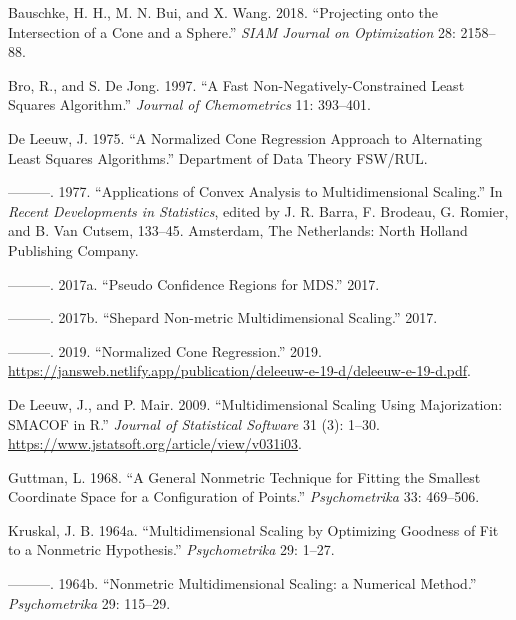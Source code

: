 \documentclass[
  12pt,
]{article}
\newlength{\cslhangindent}
\newenvironment{CSLReferences}[2] %
 {\begin{list}{}{%
  \setlength{\itemindent}{0pt}
  \setlength{\leftmargin}{0pt}
  \setlength{\parsep}{0pt}
  \ifodd #1
   \setlength{\leftmargin}{\cslhangindent}
   \setlength{\itemindent}{-1\cslhangindent}
  \fi
  \setlength{\itemsep}{#2\baselineskip}}}
 {\end{list}}
\begin{document}
\label{refs}
\begin{CSLReferences}{1}{0}
Bauschke, H. H., M. N. Bui, and X. Wang. 2018. {``{Projecting onto the Intersection of a Cone and a Sphere}.''} \emph{SIAM Journal on Optimization} 28: 2158--88.

Bro, R., and S. De Jong. 1997. {``A Fast Non-Negatively-Constrained Least Squares Algorithm.''} \emph{Journal of Chemometrics} 11: 393--401.

De Leeuw, J. 1975. {``{A Normalized Cone Regression Approach to Alternating Least Squares Algorithms}.''} Department of Data Theory FSW/RUL.

---------. 1977. {``Applications of Convex Analysis to Multidimensional Scaling.''} In \emph{Recent Developments in Statistics}, edited by J. R. Barra, F. Brodeau, G. Romier, and B. Van Cutsem, 133--45. Amsterdam, The Netherlands: North Holland Publishing Company.

---------. 2017a. {``{Pseudo Confidence Regions for MDS}.''} 2017.

---------. 2017b. {``{Shepard Non-metric Multidimensional Scaling}.''} 2017.

---------. 2019. {``Normalized Cone Regression.''} 2019. \url{https://jansweb.netlify.app/publication/deleeuw-e-19-d/deleeuw-e-19-d.pdf}.

De Leeuw, J., and P. Mair. 2009. {``{Multidimensional Scaling Using Majorization: SMACOF in R}.''} \emph{Journal of Statistical Software} 31 (3): 1--30. \url{https://www.jstatsoft.org/article/view/v031i03}.

Guttman, L. 1968. {``{A General Nonmetric Technique for Fitting the Smallest Coordinate Space for a Configuration of Points}.''} \emph{Psychometrika} 33: 469--506.

Kruskal, J. B. 1964a. {``{Multidimensional Scaling by Optimizing Goodness of Fit to a Nonmetric Hypothesis}.''} \emph{Psychometrika} 29: 1--27.

---------. 1964b. {``{Nonmetric Multidimensional Scaling: a Numerical Method}.''} \emph{Psychometrika} 29: 115--29.


\end{CSLReferences}
\end{document}
